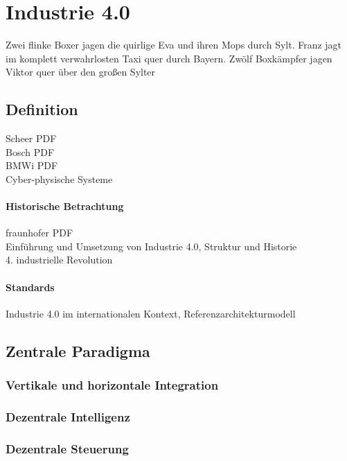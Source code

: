 \section{Industrie 4.0}
Zwei flinke Boxer jagen die quirlige Eva und ihren Mops durch Sylt. Franz jagt im komplett verwahrlosten Taxi quer durch Bayern. Zwölf Boxkämpfer jagen Viktor quer über den großen Sylter

\subsection{Definition}
Scheer PDF\\
Bosch PDF\\
BMWi PDF\\
Cyber-physische Systeme\\

\paragraph{Historische Betrachtung}
fraunhofer PDF\\
Einführung und Umsetzung von Industrie 4.0, Struktur und Historie\\
4. industrielle Revolution\\

\paragraph{Standards}
Industrie 4.0 im internationalen Kontext, Referenzarchitekturmodell\\

\subsection{Zentrale Paradigma}

\subsubsection{Vertikale und horizontale Integration}

\subsubsection{Dezentrale Intelligenz}

\subsubsection{Dezentrale Steuerung}

